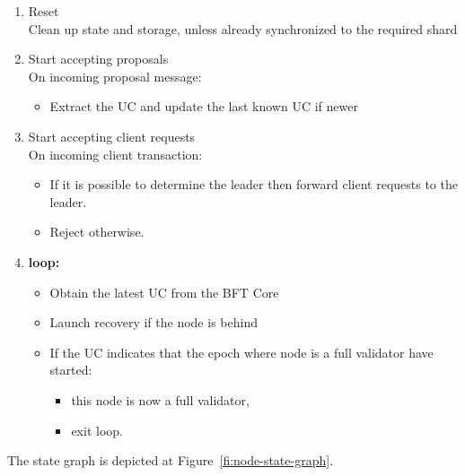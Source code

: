\begin{shaded}
  \begin{enumerate}[nosep]
    \item Reset \\
          Clean up state and storage, unless already synchronized to the required shard
    \item Start accepting proposals \\
          On incoming proposal message:
          \begin{itemize}[nosep]
            \item Extract the UC and update the last known UC if newer
          \end{itemize}
    \item Start accepting client requests \\
          On incoming client transaction:
          \begin{itemize}[nosep]
            \item If it is possible to determine the leader then forward client requests to the leader.
            \item Reject otherwise.
          \end{itemize}
    \item \textbf{loop:}
    \begin{itemize}[nosep]
      \item Obtain the latest UC from the BFT Core
      \item Launch recovery if the node is behind
      \item If the UC indicates that the epoch where node is a full validator have started:
      \begin{itemize}[nosep]
        \item this node is now a full validator,
        \item exit loop.
      \end{itemize}
    \end{itemize}
  \end{enumerate}
\end{shaded}

The state graph is depicted at Figure~\ref{fi:node-state-graph}.

